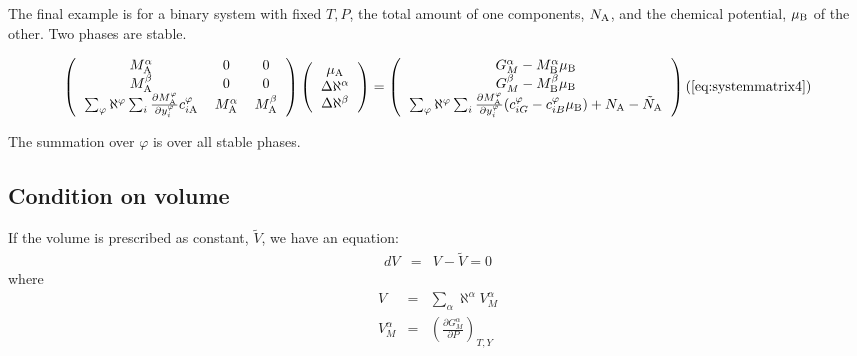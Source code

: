\documentclass[12pt]{article}
\begin{document}
The final example is for a binary system with fixed $T, P$, the total
amount of one components, $N_{\rm A}$, and the chemical potential,
$\mu_{\rm B}$ of the other.  Two phases are stable.

\label{eq:systemmatrix4}

\[
\left(
\begin{tabular}{ccc}
$M^{\alpha}_{\rm A}$ & 0 & 0  \\
$M^{\beta}_{\rm A}$ & 0 & 0 \\
$\sum_{\varphi}\aleph^{\varphi}
\sum_i\frac{\partial M^{\varphi}_{\rm A}}{\partial y_i^{\varphi}}
c^{\varphi}_{i{\rm A}}$ &
$M^{\alpha}_{\rm A}$ & $M^{\beta}_{\rm A}$
\end{tabular}
\right)
\left(
\begin{tabular}{c}
$\mu_{\rm A}$\\
$\Delta \aleph^{\alpha}$\\
$\Delta \aleph^{\beta}$
\end{tabular}
\right)
=
\left(
\begin{tabular}{c}
$G^{\alpha}_M - M^{\alpha}_{\rm B}\mu_{\rm B}$\\
$G^{\beta}_M - M^{\beta}_{\rm B}\mu_{\rm B}$\\
$\sum_{\varphi}\aleph^{\varphi}
\sum_i \frac{\partial M^{\varphi}_{\rm A}}{\partial y_i^{\varphi}}
( c^{\varphi}_{iG} - c^{\varphi}_{iB}\mu_{\rm B})+N_{\rm A}-\tilde N_{\rm A}$
\end{tabular}
\right)
\\ (\ref{eq:systemmatrix4})
\]

The summation over $\varphi$ is over all stable phases.

\subsection{Condition on volume}

If the volume is prescribed as constant, $\tilde V$, we have an
equation:
\begin{eqnarray}
dV &=& V - \tilde V= 0
\end{eqnarray}
where
\begin{eqnarray}
V &=& \sum_{\alpha} \aleph^{\alpha} V_M^{\alpha}\\
V^{\alpha}_M &=& \left(\frac{\partial G^{\alpha}_M}{\partial P}\right)_{T,Y}
\end{eqnarray}
\end{document}
